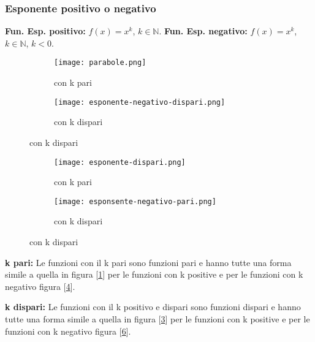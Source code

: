 \subsubsection{Esponente positivo o negativo}
\textbf{Fun. Esp. positivo:} $f(x) = x^k$, $k \in \mathbb{N}$. \hfill \textbf{Fun. Esp. negativo:} $f(x) = x^k$, $k \in \mathbb{N}$, $k < 0$.
\begin{figure}[h!]
    \begin{subfigure}{.5\textwidth}
        \centering
        \texttt{[image: parabole.png]}
        \caption{con k pari}
        \label{fig:esponente-positivo-pari}
    \end{subfigure}
    \begin{subfigure}{.5\textwidth}
        \centering
        \texttt{[image: esponente-negativo-dispari.png]}
        \caption{con k dispari}
        \label{fig:esponente-positivo-dispari}
    \end{subfigure}
\end{figure}
\begin{figure}[h!]
    \vspace{-5pt}
    \begin{subfigure}{.5\textwidth}
        \centering
        \texttt{[image: esponente-dispari.png]}
        \caption{con k pari}
        \label{fig:esponente-negativo-pari}
    \end{subfigure}
    \begin{subfigure}{.5\textwidth}
        \centering
        \texttt{[image: esponsente-negativo-pari.png]}
        \caption{con k dispari}
        \label{fig:esponente-negativo-dispari}
    \end{subfigure}
\end{figure}
\begin{observation}
    \textbf{k pari:} Le funzioni con il k pari sono funzioni pari e hanno tutte una forma simile a quella in figura [\ref{fig:esponente-positivo-pari}] per le funzioni con k positive e per le funzioni con k negativo figura [\ref{fig:esponente-negativo-pari}].
\end{observation}
\begin{observation}
    \textbf{k dispari:} Le funzioni con il k positivo e dispari sono funzioni dispari e hanno tutte una forma simile a quella in figura [\ref{fig:esponente-positivo-dispari}] per le funzioni con k positive e per le funzioni con k negativo figura [\ref{fig:esponente-negativo-dispari}].
\end{observation}

